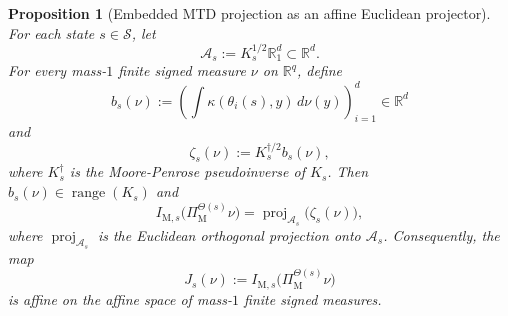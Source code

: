 \documentclass{article}
\newtheorem{proposition}[theorem]{Proposition}
\newcommand{\X}{\mathcal{S}}
\begin{document}
\begin{proposition}[Embedded MTD projection as an affine Euclidean projector]
\label{prop:mtd-proj-affine}
For each state $s \in \X$, let
\begin{equation}
\mathcal A_s := K_s^{1/2}\mathbb R_1^d \subset \mathbb R^d .
\end{equation}
For every mass-$1$ finite signed measure $\nu$ on $\mathbb R^q$, define
\begin{equation}
b_s(\nu) := \left( \int \kappa(\theta_i(s),y)\,d\nu(y) \right)_{i=1}^d \in \mathbb R^d
\end{equation}
and
\begin{equation}
\zeta_s(\nu) := K_s^{\dagger/2} b_s(\nu),
\end{equation}
where $K_s^\dagger$ is the Moore-Penrose pseudoinverse of $K_s$. Then $b_s(\nu) \in \operatorname{range}(K_s)$ and
\begin{equation}
I_{\mathrm M,s}\bigl(\Pi_{\mathrm M}^{\Theta(s)}\nu\bigr) = \operatorname{proj}_{\mathcal A_s}\bigl(\zeta_s(\nu)\bigr),
\end{equation}
where $\operatorname{proj}_{\mathcal A_s}$ is the Euclidean orthogonal projection onto $\mathcal A_s$. Consequently, the map
\begin{equation}
J_s(\nu) := I_{\mathrm M,s}\bigl(\Pi_{\mathrm M}^{\Theta(s)}\nu\bigr)
\end{equation}
is affine on the affine space of mass-$1$ finite signed measures.
\end{proposition}
\end{document}
